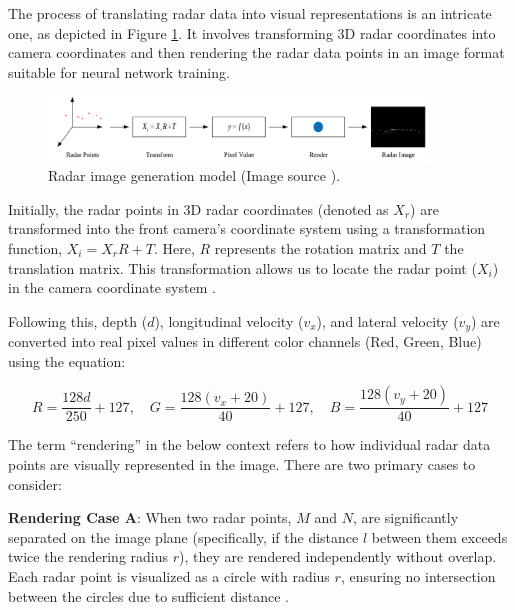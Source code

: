\documentclass[report.tex]{subfiles}
\begin{document}
    The process of translating radar data into visual representations is an intricate one, as depicted in Figure \ref{fig:saffcos_radar_image_generation_process}. It involves transforming 3D radar coordinates into camera coordinates and then rendering the radar data points in an image format suitable for neural network training.

    \begin{figure}[h]
        \centering
        \includegraphics[width=0.9\textwidth]{images/methods/saf_fcos/the_radar_image_generation_process.png}
        \caption{Radar image generation model (Image source \cite{chang2020spatial}).}
        \label{fig:saffcos_radar_image_generation_process}
    \end{figure}

    Initially, the radar points in 3D radar coordinates (denoted as ${X_r}$) are transformed into the front camera's coordinate system using a transformation function, ${X_i = X_r R + T}$. Here, ${R}$ represents the rotation matrix and ${T}$ the translation matrix. This transformation allows us to locate the radar point (${X_i}$) in the camera coordinate system \cite{chang2020spatial}.

    \vspace{\baselineskip}
    \vspace{\baselineskip}
    \vspace{\baselineskip}

    Following this, depth (${d}$), longitudinal velocity (${v_x}$), and lateral velocity (${v_y}$) are converted into real pixel values in different color channels (Red, Green, Blue) using the equation:

    \begin{equation}
        R = \frac{128d}{250} + {127}, \quad G = \frac{128(v_x + 20)}{40} + {127}, \quad B = \frac{128(v_y + 20)}{40} + {127}
    \end{equation}

    

    The term ``rendering'' in the below context refers to how individual radar data points are visually represented in the image. There are two primary cases to consider:

    \textbf{Rendering Case A}: When two radar points, \( M \) and \( N \), are significantly separated on the image plane (specifically, if the distance \( l \) between them exceeds twice the rendering radius \( r \)), they are rendered independently without overlap. Each radar point is visualized as a circle with radius \( r \), ensuring no intersection between the circles due to sufficient distance \cite{chang2020spatial}.
\end{document}
